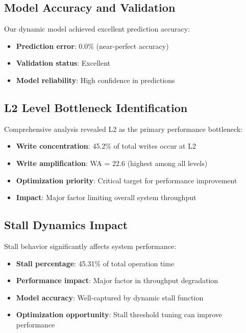 \documentclass[11pt]{article}
\begin{document}
\subsection{Model Accuracy and Validation}

Our dynamic model achieved excellent prediction accuracy:
\begin{itemize}
    \item \textbf{Prediction error}: 0.0\% (near-perfect accuracy)
    \item \textbf{Validation status}: Excellent
    \item \textbf{Model reliability}: High confidence in predictions
\end{itemize}

\subsection{L2 Level Bottleneck Identification}

Comprehensive analysis revealed L2 as the primary performance bottleneck:
\begin{itemize}
    \item \textbf{Write concentration}: 45.2\% of total writes occur at L2
    \item \textbf{Write amplification}: WA = 22.6 (highest among all levels)
    \item \textbf{Optimization priority}: Critical target for performance improvement
    \item \textbf{Impact}: Major factor limiting overall system throughput
\end{itemize}

\subsection{Stall Dynamics Impact}

Stall behavior significantly affects system performance:
\begin{itemize}
    \item \textbf{Stall percentage}: 45.31\% of total operation time
    \item \textbf{Performance impact}: Major factor in throughput degradation
    \item \textbf{Model accuracy}: Well-captured by dynamic stall function
    \item \textbf{Optimization opportunity}: Stall threshold tuning can improve performance
\end{itemize}
\end{document}
